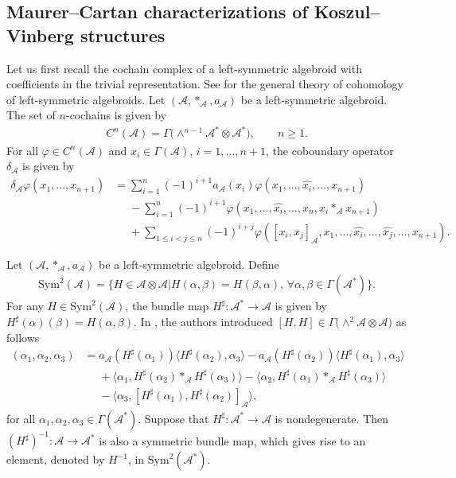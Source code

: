 \documentclass[pdftex]{sigma}%
\numberwithin{equation}{section}
\newcommand{\huaA}{\mathcal{A}}
\newcommand{\Sym}{\mathrm{Sym}}
\begin{document}
\subsection{Maurer--Cartan characterizations of Koszul--Vinberg structures}
Let us first recall the cochain complex of a left-symmetric algebroid with coefficients in the trivial representation. See \cite{LiuShengBaiChen} for the general theory of cohomology of left-symmetric algebroids. Let $(\huaA,\ast_\huaA,a_\huaA)$ be a left-symmetric algebroid. The set of $n$-cochains is given by
\begin{gather*}
C^{n}(\huaA)=\Gamma\big({\wedge}^{n-1}\huaA^*\otimes \huaA^*\big),\qquad
n\geq1.
\end{gather*}
For all $\varphi\in C^{n}(\huaA)$ and $x_i\in \Gamma(\huaA)$, $i=1,\dots,n+1$, the coboundary operator
$\delta_\huaA$ is given by
 \begin{align}
\delta_\huaA\varphi(x_1,\dots,x_{n+1})
 &=\sum_{i=1}^{n}(-1)^{i+1}a_\huaA(x_i)\varphi(x_1,\dots,\hat{x_i},\dots,x_{n+1})\nonumber
 \\
&\phantom{=}-\sum_{i=1}^{n}(-1)^{i+1}\varphi(x_1,\dots,\hat{x_i},\dots,x_n,x_i\ast_\huaA x_{n+1})\nonumber
\\
&\phantom{=}+\sum_{1\leq i<j\leq n}(-1)^{i+j}\varphi([x_i,x_j]_\huaA,x_1,\dots,\hat{x_i},\dots,\hat{x_j},\dots,x_{n+1}).
\label{LSCA cohomology}
\end{align}


Let $(\huaA,\ast_\huaA,a_\huaA)$ be a left-symmetric algebroid. Define
\begin{gather*}
\Sym^2(\huaA)=\{H\in \huaA\otimes \huaA| H(\alpha,\beta)=H(\beta,\alpha),\,
\forall\alpha,\beta\in \Gamma(\huaA^*)\}.
\end{gather*}
For any $H\in \Sym^2(\huaA)$, the bundle map $H^\sharp\colon \huaA^*\longrightarrow \huaA$ is given by $H^\sharp(\alpha)(\beta)=H(\alpha,\beta)$.
In \cite{lsb2}, the authors introduced $[ H,H]\in\Gamma\big({\wedge}^2\huaA \otimes \huaA\big) $ as follows
\begin{align}
[H,H](\alpha_1,\alpha_2,\alpha_3)&=a_\huaA(H^\sharp(\alpha_1))\langle H^\sharp(\alpha_2),\alpha_3\rangle-a_\huaA(H^\sharp(\alpha_2))\langle H^\sharp(\alpha_1),\alpha_3\rangle\nonumber
\\
&\phantom{=}+\langle \alpha_1,H^\sharp(\alpha_2)\ast_\huaA H^\sharp(\alpha_3)\rangle-\langle\alpha_2,H^\sharp(\alpha_1)\ast_\huaA H^\sharp(\alpha_3)\rangle
\nonumber
\\
&\phantom{=}-\langle \alpha_3,[H^\sharp(\alpha_1),
H^\sharp(\alpha_2)]_\huaA\rangle,\label{brac2}
\end{align}
for all $\alpha_1,\alpha_2,\alpha_3\in\Gamma(\huaA^*)$. Suppose that $H^\sharp\colon \huaA^*\longrightarrow \huaA$ is nondegenerate. Then $(H^\sharp)^{-1}\colon \huaA\longrightarrow \huaA^*$ is also a symmetric bundle map, which gives rise to an element, denoted by $H^{-1}$, in $\Sym^2(\huaA^*)$.
\end{document}
